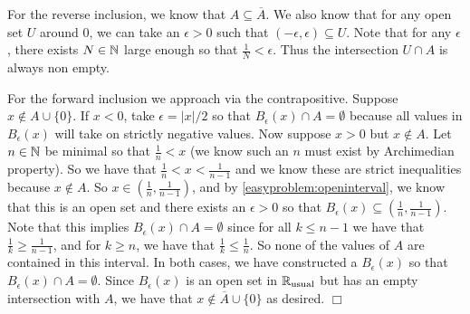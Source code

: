 \documentclass{article}
\begin{document}
 {
    For the reverse inclusion, we know that $A\subseteq \overline{A}$. We also know that for any open set $U$ around 0, we can take an $\epsilon > 0$ such that $(-\epsilon, \epsilon)\subseteq U$. Note that for any $\epsilon$, there exists $N\in \mathbb{N}$ large enough so that $\frac{1}{N} < \epsilon$. Thus the intersection $U\cap A$ is always non empty.

    For the forward inclusion we approach via the contrapositive. Suppose $x\not\in A\cup \{0\}$. If $x < 0$, take $\epsilon = \lvert x\rvert/2$ so that $B_{\epsilon}(x)\cap A  = \emptyset$ because all values in $B_{\epsilon}(x)$ will take on strictly negative values. Now suppose $x > 0$ but $x\not\in A$. Let $n\in \mathbb{N}$ be minimal so that $\frac{1}{n} < x$ (we know such an $n$ must exist by Archimedian property). So we have that $\frac{1}{n} < x < \frac{1}{n-1}$ and we know these are strict inequalities because $x\not \in A$. So $x\in \left(\frac{1}{n}, \frac{1}{n-1}\right)$, and by \ref{easyproblem:openinterval}, we know that this is an open set and there exists an $\epsilon > 0$ so that $B_{\epsilon}(x)\subseteq \left(\frac{1}{n}, \frac{1}{n-1}\right)$. Note that this implies $B_{\epsilon}(x)\cap A = \emptyset$ since for all $k \leq n-1$ we have that $\frac{1}{k} \geq \frac{1}{n-1}$, and for $k\geq n$, we have that $\frac{1}{k}\leq \frac{1}{n}$. So none of the values of $A$ are contained in this interval. In both cases, we have constructed a $B_{\epsilon}(x)$ so that $B_{\epsilon}(x)\cap A = \emptyset$. Since $B_{\epsilon}(x)$ is an open set in $\mathbb{R}_{\text{usual}}$ but has an empty intersection with $A$, we have that $x\not\in \overline{A}\cup\{0\}$ as desired. $\Box$
}
\end{document}

